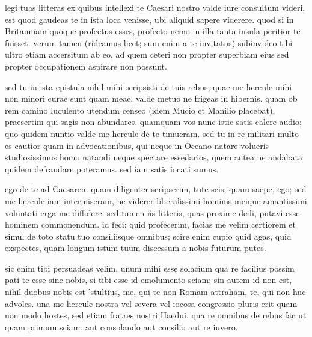 


 legi tuas litteras ex quibus intellexi te Caesari nostro valde iure consultum videri. est quod gaudeas te in ista loca venisse, ubi aliquid sapere viderere. quod si in Britanniam quoque profectus esses, profecto nemo in illa tanta insula peritior te fuisset. verum tamen (rideamus licet; sum enim a te invitatus) subinvideo tibi ultro etiam accersitum ab eo, ad quem ceteri non propter superbiam eius sed propter occupationem aspirare non possunt.

 sed tu in ista epistula nihil mihi scripsisti de tuis rebus, quae me hercule mihi non minori curae sunt quam meae. valde metuo ne frigeas in hibernis. quam ob rem camino luculento utendum censeo (idem Mucio et Manilio placebat), praesertim qui sagis non abundares. quamquam vos nunc istic satis calere audio; quo quidem nuntio valde me hercule de te timueram. sed tu in re militari multo es cautior quam in advocationibus, qui neque in Oceano natare volueris studiosissimus homo natandi neque spectare essedarios, quem antea ne andabata quidem defraudare poteramus. sed iam satis iocati sumus.

 ego de te ad Caesarem quam diligenter scripserim, tute scis, quam saepe, ego; sed me hercule iam intermiseram, ne viderer liberalissimi hominis meique amantissimi voluntati erga me diffidere. sed tamen iis litteris, quas proxime dedi, putavi esse hominem commonendum. id feci; quid profecerim, facias me velim certiorem et simul de toto statu tuo consiliisque omnibus; scire enim cupio quid agas, quid exspectes, quam longum istum tuum discessum a nobis futurum putes.

 sic enim tibi persuadeas velim, unum mihi esse solacium qua re facilius possim pati te esse sine nobis, si tibi esse id emolumento sciam; sin autem id non est, nihil duobus nobis est 'stultius, me, qui te non Romam attraham, te, qui non huc advoles. una me hercule nostra vel severa vel iocosa congressio pluris erit quam non modo hostes, sed etiam fratres nostri Haedui. qua re omnibus de rebus fac ut quam primum sciam. aut consolando aut consilio aut re iuvero.
